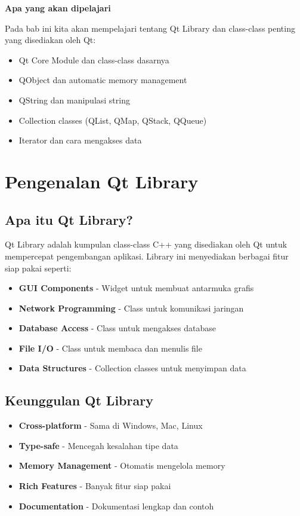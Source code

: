 \textbf{Apa yang akan dipelajari}

Pada bab ini kita akan mempelajari tentang Qt Library dan class-class penting yang disediakan oleh Qt:

\begin{itemize}
\item Qt Core Module dan class-class dasarnya
\item QObject dan automatic memory management
\item QString dan manipulasi string
\item Collection classes (QList, QMap, QStack, QQueue)
\item Iterator dan cara mengakses data
\end{itemize}

\minitoc

\section{Pengenalan Qt Library}

\subsection{Apa itu Qt Library?}

Qt Library adalah kumpulan class-class C++ yang disediakan oleh Qt untuk mempercepat pengembangan aplikasi. Library ini menyediakan berbagai fitur siap pakai seperti:

\begin{itemize}
\item \textbf{GUI Components} - Widget untuk membuat antarmuka grafis
\item \textbf{Network Programming} - Class untuk komunikasi jaringan
\item \textbf{Database Access} - Class untuk mengakses database
\item \textbf{File I/O} - Class untuk membaca dan menulis file
\item \textbf{Data Structures} - Collection classes untuk menyimpan data
\end{itemize}

\subsection{Keunggulan Qt Library}

\begin{itemize}
\item \textbf{Cross-platform} - Sama di Windows, Mac, Linux
\item \textbf{Type-safe} - Mencegah kesalahan tipe data
\item \textbf{Memory Management} - Otomatis mengelola memory
\item \textbf{Rich Features} - Banyak fitur siap pakai
\item \textbf{Documentation} - Dokumentasi lengkap dan contoh
\end{itemize}


